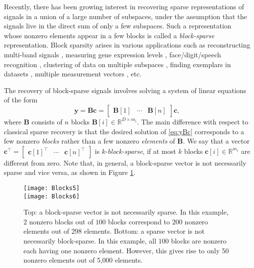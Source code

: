 \documentclass[10pt,twocolumn,twoside] {IEEEtran}
\begin{document}
Recently, there has been growing interest in recovering sparse representations of signals in a union of a large number of subspaces, under the assumption that the signals live in the direct sum of only a few subspaces. Such a representation whose nonzero elements appear in a few blocks is called a \emph{block-sparse} representation. Block sparsity arises in various applications such as reconstructing multi-band signals \cite{Mishali:TSP09, Eldar:STSP10}, measuring gene expression levels \cite{Parvaresh:STSP08}, face/digit/speech recognition \cite{Wright:PAMI09, Elhamifar:CVPR11, Gemmeke:ISCA08,Gemmeke:EUSIPCO08}, clustering of data on multiple subspaces \cite{Elhamifar:CVPR09, Elhamifar:ICASSP10, Elhamifar:TPAMI12, Candes:TechRep11}, finding exemplars in datasets \cite{Elhamifar:CVPR12}, multiple measurement vectors \cite{Cotter:TSP05, Chen:TSP06, VandenBerg:TIT10, Lai:ACHA11}, etc.

The recovery of block-sparse signals involves solving a system of linear equations of the form 
\begin{equation}
\label{eq:yBc}
{\boldsymbol{y}} = {\boldsymbol{B}} {\boldsymbol{c}} = \begin{bmatrix} {\boldsymbol{B}}[1] & \cdots & {\boldsymbol{B}}[n] \end{bmatrix} {\boldsymbol{c}},
\end{equation}
where ${\boldsymbol{B}}$ consists of $n$ blocks ${\boldsymbol{B}}[i] \in {\mathbb{R}}^{D \times m_i}$. 
The main difference with respect to classical sparse recovery is that the desired solution of \eqref{eq:yBc} corresponds to a few nonzero \emph{blocks} rather than a few nonzero \emph{elements} of ${\boldsymbol{B}}$. We say that a vector ${\boldsymbol{c}}^{\top} = \begin{bmatrix} {\boldsymbol{c}}[1]^{\top} & \cdots & {\boldsymbol{c}}[n]^{\top} \end{bmatrix}$ is $k$-\emph{block-sparse}, if at most $k$ blocks ${\boldsymbol{c}}[i] \in {\mathbb{R}}^{m_i}$ are different from zero. Note that, in general, a block-sparse vector is not necessarily sparse and vice versa, as shown in Figure \ref{fig:blk}.

\begin{figure}[t]
\centering
\texttt{[image: Blocks5]} \\
\vspace{2mm}
\hspace{.1mm}
\texttt{[image: Blocks6]}
\vspace{-1mm}
\caption{\footnotesize{Top: a block-sparse vector is not necessarily sparse. In this example, $2$ nonzero blocks out of $100$ blocks correspond to $200$ nonzero elements out of $298$ elements. Bottom: a sparse vector is not necessarily block-sparse. In this example, all $100$ blocks are nonzero each having one nonzero element. However, this gives rise to only 50 nonzero elements out of 5,000 elements.}}
\label{fig:blk}
\end{figure}
\end{document}
